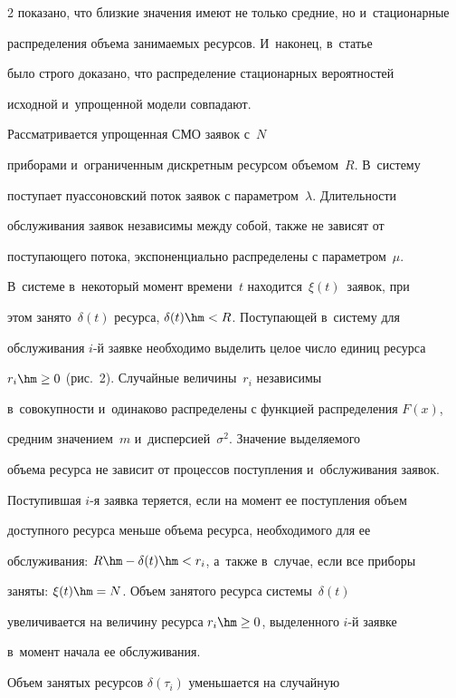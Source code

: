 \begin{multicols}{2}
показано, что близкие значения имеют не только средние, но и~стационарные 

распределения объема занимаемых ресурсов. И~наконец, в~статье~\cite{3-v} 

было строго доказано, что распределение стационарных вероятностей 

исходной и~упрощенной модели совпадают. 

  

  Рассматривается упрощенная СМО заявок с~$N$ 

приборами и~ограниченным дискретным ресурсом объемом~$R$. В~систему 

поступает пуассоновский поток заявок с параметром~$\lambda$. Длительности 

обслуживания заявок независимы между собой, также не зависят от 

поступающего потока, экспоненциально распределены с параметром~$\mu$. 

В~системе в~некоторый момент времени~$t$ находится~$\xi(t)$~заявок, при 

этом занято~$\delta(t)$ ресурса, $\delta(t)\hm<R$. Поступающей в~систему для 

обслуживания $i$-й заявке необходимо выделить целое число единиц ресурса 

$r_i\hm\geq 0$ (рис.~2). Случайные величины~$r_i$ независимы 

в~совокупности и~одинаково распределены с функцией распределения $F(x)$, 

средним значением~$m$ и~дисперсией~$\sigma^2$. Значение выделяемого 

объема ресурса не зависит от процессов поступления и~обслуживания заявок. 

  

  Поступившая $i$-я заявка теряется, если на момент ее поступления объем 

доступного ресурса меньше объема ресурса, необходимого для ее 

обслуживания: $R\hm- \delta(t)\hm< r_i$, а~также в~случае, если все приборы 

заняты: $\xi(t)\hm=N$. Объем занятого ресурса системы~$\delta(t)$ 

увеличивается на величину ресурса $r_i\hm\geq 0$, выделенного $i$-й заявке 

в~момент начала ее обслуживания.

  

  Объем занятых ресурсов $\delta(\tau_i)$ уменьшается на случайную 


\end{multicols}

